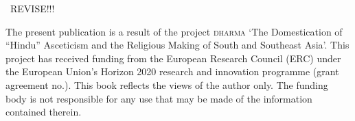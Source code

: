 \bigskip

\noindent

\CHECK\ REVISE!!!

{\footnotesize
The present publication is a result of the project \textsc{dharma} `The
Domestication of ``Hindu'' Asceticism and the Religious Making of South and Southeast Asia'.  This project has received funding from the European Research Council (ERC) under the European Union's Horizon 2020 research and innovation programme (grant agreement no.).  This book reflects the views of the author only.  The funding body is not responsible for any use that
may be made of the information contained therein.}


\vfill
\pagebreak
